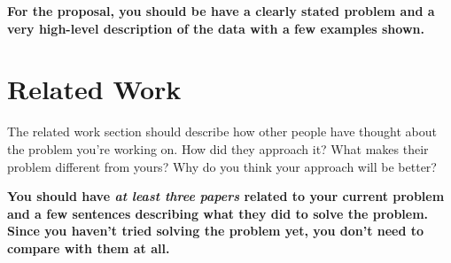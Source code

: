 \documentclass[11pt,a4paper]{article}
\begin{document}
\begin{table*}
\centering
\caption{Examples of datasets that you could choose to work on for your project.  }
\label{tab:tasks}
\end{table*}

\textbf{\color{red} For the proposal, you should be have a clearly stated problem and a very high-level description of the data with a few examples shown.}



\section{Related Work}

The related work section should describe how other people have thought about the
problem you're working on.  How did they approach it?  What makes their problem
different from yours?  Why do you think your approach will be better?

\textbf{\color{red} You should have \textit{at least three papers} related to your current problem and a few sentences describing what they did to solve the problem.  Since you haven't tried solving the problem yet, you don't need to compare with them at all.}
\end{document}
